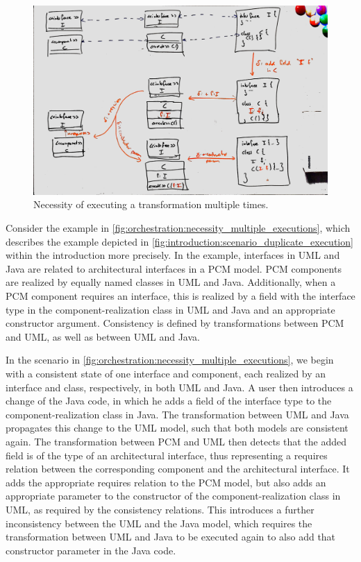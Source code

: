 \begin{figure}
    \centering
    \includegraphics[width=\textwidth]{figures/correctness/orchestration/necessity_multiple_executions.jpg}
    \caption[Necessity of executing a transformation multiple times]{Necessity of executing a transformation multiple times.}
    \label{fig:orchestration:necessity_multiple_executions}
\end{figure}

Consider the example in \autoref{fig:orchestration:necessity_multiple_executions}, which describes the example depicted in \autoref{fig:introduction:scenario_duplicate_execution} within the introduction more precisely.
In the example, interfaces in UML and Java are related to architectural interfaces in a \gls{PCM} model.
\gls{PCM} components are realized by equally named classes in UML and Java.
Additionally, when a \gls{PCM} component requires an interface, this is realized by a field with the interface type in the component-realization class in UML and Java and an appropriate constructor argument.
Consistency is defined by transformations between \gls{PCM} and UML, as well as between UML and Java.

In the scenario in \autoref{fig:orchestration:necessity_multiple_executions}, we begin with a consistent state of one interface and component, each realized by an interface and class, respectively, in both UML and Java.
A user then introduces a change of the Java code, in which he adds a field of the interface type to the component-realization class in Java.
The transformation between UML and Java propagates this change to the UML model, such that both models are consistent again.
The transformation between \gls{PCM} and UML then detects that the added field is of the type of an architectural interface, thus representing a requires relation between the corresponding component and the architectural interface. 
It adds the appropriate requires relation to the \gls{PCM} model, but also adds an appropriate parameter to the constructor of the component-realization class in UML, as required by the consistency relations.
This introduces a further inconsistency between the UML and the Java model, which requires the transformation between UML and Java to be executed again to also add that constructor parameter in the Java code.

